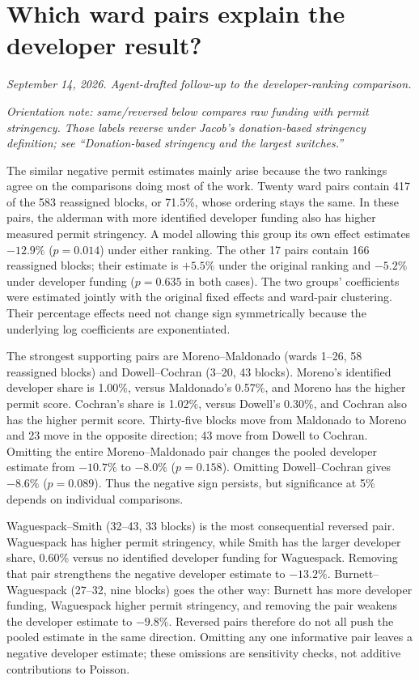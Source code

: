 \clearpage
\section*{Which ward pairs explain the developer result?}
\textit{September 14, 2026. Agent-drafted follow-up to the developer-ranking comparison.}

\textit{Orientation note: same/reversed below compares raw funding with permit stringency. Those labels reverse under Jacob's donation-based stringency definition; see ``Donation-based stringency and the largest switches.''}

The similar negative permit estimates mainly arise because the two rankings agree on the comparisons doing most of the work. Twenty ward pairs contain 417 of the 583 reassigned blocks, or 71.5\%, whose ordering stays the same. In these pairs, the alderman with more identified developer funding also has higher measured permit stringency. A model allowing this group its own effect estimates $-12.9\%$ ($p=0.014$) under either ranking. The other 17 pairs contain 166 reassigned blocks; their estimate is $+5.5\%$ under the original ranking and $-5.2\%$ under developer funding ($p=0.635$ in both cases). The two groups' coefficients were estimated jointly with the original fixed effects and ward-pair clustering. Their percentage effects need not change sign symmetrically because the underlying log coefficients are exponentiated.

The strongest supporting pairs are Moreno--Maldonado (wards 1--26, 58 reassigned blocks) and Dowell--Cochran (3--20, 43 blocks). Moreno's identified developer share is 1.00\%, versus Maldonado's 0.57\%, and Moreno has the higher permit score. Cochran's share is 1.02\%, versus Dowell's 0.30\%, and Cochran also has the higher permit score. Thirty-five blocks move from Maldonado to Moreno and 23 move in the opposite direction; 43 move from Dowell to Cochran. Omitting the entire Moreno--Maldonado pair changes the pooled developer estimate from $-10.7\%$ to $-8.0\%$ ($p=0.158$). Omitting Dowell--Cochran gives $-8.6\%$ ($p=0.089$). Thus the negative sign persists, but significance at 5\% depends on individual comparisons.

Waguespack--Smith (32--43, 33 blocks) is the most consequential reversed pair. Waguespack has higher permit stringency, while Smith has the larger developer share, 0.60\% versus no identified developer funding for Waguespack. Removing that pair strengthens the negative developer estimate to $-13.2\%$. Burnett--Waguespack (27--32, nine blocks) goes the other way: Burnett has more developer funding, Waguespack higher permit stringency, and removing the pair weakens the developer estimate to $-9.8\%$. Reversed pairs therefore do not all push the pooled estimate in the same direction. Omitting any one informative pair leaves a negative developer estimate; these omissions are sensitivity checks, not additive contributions to Poisson.

